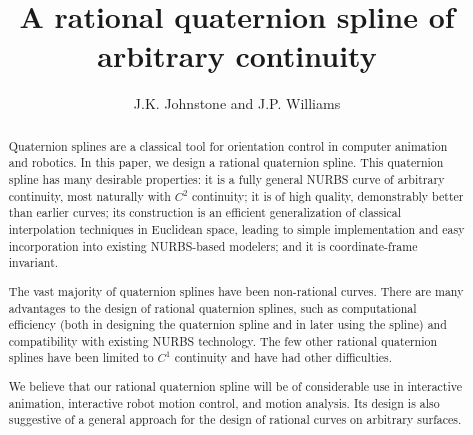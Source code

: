 \newif\ifFull
\Fullfalse

\SingleSpace

\setlength{\oddsidemargin}{0pt}
\setlength{\topmargin}{0in}	%
\setlength{\textheight}{8.5in}
\setlength{\textwidth}{6.5in}
\setlength{\columnsep}{5mm}	%

\title{A rational quaternion spline of arbitrary continuity}
\author{J.K. Johnstone and J.P. Williams}


\maketitle

\begin{abstract}
Quaternion splines are a classical tool for orientation control in computer
animation and robotics.
In this paper, we design a rational quaternion spline.
This quaternion spline has many desirable properties:
it is a fully general NURBS curve of arbitrary continuity,
most naturally with $C^2$ continuity;
it is of high quality, demonstrably better than earlier curves;
its construction is an efficient generalization of classical interpolation
techniques in Euclidean space, leading to simple implementation and
easy incorporation into existing NURBS-based modelers;
and it is coordinate-frame invariant.

The vast majority of quaternion splines have been non-rational curves.
There are many advantages to the design of rational quaternion splines,
such as computational efficiency (both in designing the
quaternion spline and in later using the spline) and compatibility 
with existing NURBS technology.
The few other rational quaternion splines have been limited to
$C^1$ continuity and have had other difficulties.

We believe that our rational quaternion spline will be of considerable
use in interactive animation, interactive robot motion control, and 
motion analysis.
Its design is also suggestive of a general approach for the design
of rational curves on arbitrary surfaces.
\end{abstract}

